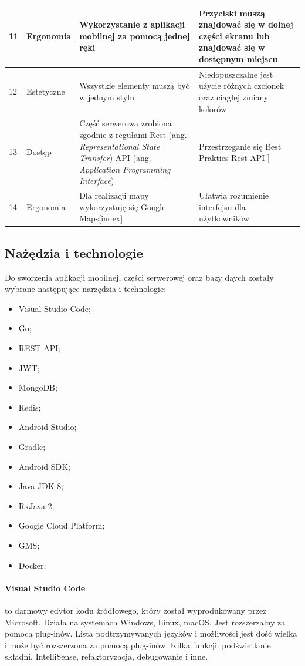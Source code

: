 \begin{table}[htb]
\begin{tabular}{| m{0.5cm} | m{3cm} | m{5.75cm} | m{5.75cm} |}
    \hline
    11 & Ergonomia & Wykorzystanie z aplikacji mobilnej za pomocą jednej ręki & Przyciski muszą znajdować się w dolnej części ekranu lub znajdować się w dostępnym miejscu \\
    \hline
    12 & Estetyczne & Wszystkie elementy muszą być w jednym stylu & Niedopuszczalne jest użycie różnych czcionek oraz ciągłej zmiany kolorów \\
    \hline
    13 & Dostęp & Część serwerowa zrobiona zgodnie z regułami Rest (ang. \textit{Representational State Transfer}) API (ang. \textit{Application Programming Interface}) & Przestrzeganie się Best Prakties Rest API \cite{rest_api_best}] \\
    \hline
    14 & Ergonomia & Dla realizacji mapy wykorzystuję się Google Maps[index] & Ułatwia rozumienie interfejsu dla użytkowników \\
    \hline
\end{tabular}
\end{table}
\newpage
\subsection{Nażędzia i technologie}
Do sworzenia aplikacji mobilnej, części serwerowej oraz bazy daych zostały wybrane następujące narzędzia i technologie:
\begin{itemize}
    \item Visual Studio Code;
    \item Go;
    \item REST API;
    \item JWT;
    \item MongoDB;
    \item Redis;
    \item Android Studio;
    \item Gradle;
    \item Android SDK;
    \item Java JDK 8;
    \item RxJava 2;
    \item Google Cloud Platform;
    \item GMS;
    \item Docker;
\end{itemize}

\paragraph{Visual Studio Code} \cite{vscode} to darmowy edytor kodu źródłowego, który został wyprodukowany przez Microsoft. Działa na systemach Windows, Linux, macOS. Jest rozszerzalny za pomocą plug-inów.
Lista podtrzymywanych języków i możliwości jest dość wielka i może być rozszerzona za pomocą plug-inów. Kilka funkcji: podświetlanie składni, IntelliSense, refaktoryzacja, debugowanie i inne.

